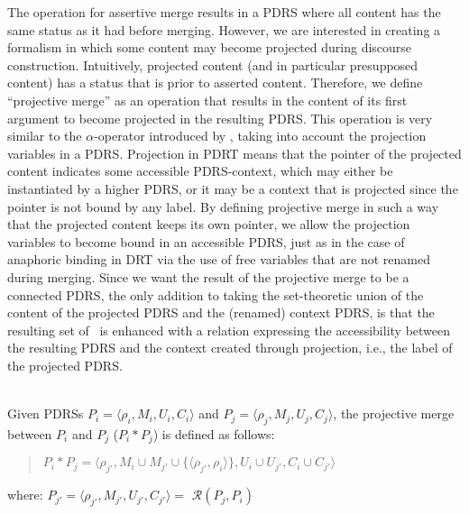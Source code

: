 \noindent The operation for assertive merge results in a PDRS where all
content has the same status as it had before merging. However, we are
interested in creating a formalism in which some content may become
projected during discourse construction.  Intuitively, projected content
(and in particular presupposed content) has a status that is prior to
asserted content.  Therefore, we define ``projective merge'' as an operation
that results in the content of its first argument to become projected in the
resulting PDRS.  This operation is very similar to the $\alpha$-operator
introduced by \cite{bos2003implementing}, taking into account the projection
variables in a PDRS. Projection in PDRT means that the pointer of the
projected content indicates some accessible PDRS-context, which may either
be instantiated by a higher PDRS, or it may be a context that is projected
since the pointer is not bound by any label. By defining projective merge in
such a way that the projected content keeps its own pointer, we allow the
projection variables to become bound in an accessible PDRS, just as in the
case of anaphoric binding in DRT via the use of free variables that are not
renamed during merging. Since we want the result of the projective merge to
be a connected PDRS, the only addition to taking the set-theoretic union of
the content of the projected PDRS and the (renamed) context PDRS, is that
the resulting set of \MAPs~is enhanced with a relation expressing the
accessibility between the resulting PDRS and the context created through
projection, i.e., the label of the projected PDRS.

\begin{definition}\label{def:pmerge}~\\
Given PDRSs $P_i=\langle \rho_i,M_i,U_i,C_i \rangle$ and 
$P_j=\langle \rho_j,M_j,U_j,C_j\rangle$, the projective merge between $P_i$
and $P_j$ ($P_i \ast P_j$) is defined as follows:
  \begin{quote}
    $P_i \ast P_j = 
      \langle \rho_{j'}, 
        M_{i}\cup M_{j'}\cup\{\langle\rho_{j'},\rho_{i}\rangle\}, 
        U_{i}\cup U_{j'},C_{i} \cup C_{j'}\rangle$
  \end{quote}
  where: $P_{j'} = \langle \rho_{j'}, M_{j'}, U_{j'}, C_{j'} \rangle =$ 
      $\mathcal{R}(P_j,P_i)$
\end{definition}

